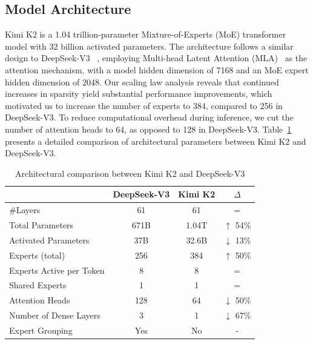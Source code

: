 \subsection{Model Architecture}
Kimi K2 is a 1.04 trillion-parameter Mixture-of-Experts (MoE) transformer model with 32 billion activated parameters. The architecture follows a similar design to DeepSeek-V3~\citep{deepseekai2024deepseekv3technicalreport} , employing Multi-head Latent Attention (MLA)~\citep{liu2024deepseek} as the attention mechanism, with a model hidden dimension of 7168 and an MoE expert hidden dimension of 2048. Our scaling law analysis reveals that continued increases in sparsity yield substantial performance improvements, which motivated us to increase the number of experts to 384, compared to 256 in DeepSeek-V3. To reduce computational overhead during inference, we cut the number of attention heads to 64, as opposed to 128 in DeepSeek-V3. Table~\ref{tab:k2_arch_comparison} presents a detailed comparison of architectural parameters between Kimi K2 and DeepSeek-V3.

\begin{table}[htbp]
\centering
\caption{Architectural comparison between Kimi K2 and DeepSeek-V3}
\label{tab:k2_arch_comparison}
\begin{tabular}{lccc}
\toprule
  & \textbf{DeepSeek-V3} & \textbf{Kimi K2} & \textbf{$\Delta$} \\
\midrule
\#Layers & 61 & 61 & = \\
Total Parameters & 671B & 1.04T & $\uparrow$ 54\% \\
Activated Parameters & 37B & 32.6B & $\downarrow$ 13\% \\
Experts (total) & 256 & 384 & $\uparrow$ 50\% \\
Experts Active per Token & 8 & 8 & = \\
Shared Experts & 1 & 1 & = \\
Attention Heads & 128 & 64 & $\downarrow$ 50\% \\
Number of Dense Layers & 3 & 1 & $\downarrow$ 67\% \\
Expert Grouping & Yes & No  & - \\
\bottomrule
\end{tabular}
\end{table}


